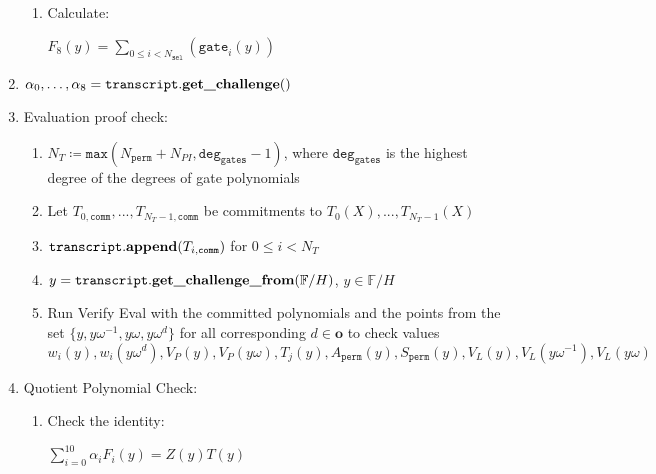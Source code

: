 \begin{enumerate}
\begin{enumerate}
	    \item Calculate:
		    \begin{center}
		    	$F_8(y) = \sum\limits_{0 \leq i < N_{\texttt{sel}}} (\texttt{gate}_i(y))$
		    \end{center}
	\end{enumerate}
	\item $\alpha_0, \dots, \alpha_8 = \texttt{transcript}.\textbf{get\_challenge}()$
	\item Evaluation proof check:
	\begin{enumerate}
		\item $N_T \coloneqq \texttt{max}(N_{\texttt{perm}} + N_{PI}, \texttt{deg}_{\texttt{gates}} - 1)$, 
			where $\texttt{deg}_{\texttt{gates}}$ is the highest degree of the degrees of gate polynomials
		\item Let $T_{0, \texttt{comm}}, ..., T_{N_T - 1, \texttt{comm}}$ be commitments to $T_0(X), ..., T_{N_T - 1}(X)$ 
		\item $\texttt{transcript}.\textbf{append}(T_{i, \texttt{comm}})$ for $0 \leq i < N_T$
		\item $y = \texttt{transcript}.\textbf{get\_challenge\_from}(\mathbb{F}/H)$, $y \in \mathbb{F}/H$
    	\item Run Verify Eval with the committed polynomials and the points from the set $\{y, y\omega^{-1}, y\omega, y\omega^{d}\}$ for all corresponding $d \in \mathbf{o}$ to check values 
        $w_i(y), w_i(y\omega^d), V_P(y), V_P(y\omega),T_j(y), A_{\texttt{perm}}(y), S_{\texttt{perm}}(y), V_L(y), V_L(y\omega^{-1}), V_L(y\omega)$  \\
	\end{enumerate}
	\item Quotient Polynomial Check:
	\begin{enumerate}
	    \item Check the identity:
	        \begin{center}
	            $\sum\limits_{i = 0}^{10}\alpha_iF_i(y) = Z(y)T(y)$
	        \end{center}
	\end{enumerate}
\end{enumerate}

